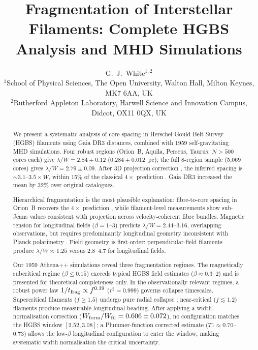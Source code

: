 \documentclass[twoside,twocolumn]{mnras}
\title{Fragmentation of Interstellar Filaments: Complete HGBS Analysis and MHD Simulations}
\author[G.~J.~White]{G.~J.~White$^{1,2}$\\
$^{1}$School of Physical Sciences, The Open University, Walton Hall, Milton Keynes, MK7 6AA, UK\\
$^{2}$Rutherford Appleton Laboratory, Harwell Science and Innovation Campus, Didcot, OX11 0QX, UK}
\begin{document}
\maketitle

\begin{abstract}
We present a systematic analysis of core spacing in Herschel Gould Belt Survey (HGBS)
filaments using Gaia DR3 distances, combined with 1959 self-gravitating MHD simulations.
Four robust regions (Orion~B, Aquila, Perseus, Taurus; $N>500$ cores each) give
$\lambda/W = 2.84 \pm 0.12$ ($0.284 \pm 0.012$~pc); the full 8-region sample (5,069 cores)
gives $\lambda/W = 2.79 \pm 0.09$. After 3D projection correction \citep{Andre2010,Planck2016},
the inferred spacing is ${\sim}3.1$--$3.5\times W$, within 15\% of the classical $4\times$
prediction \citep{Inutsuka1992}. Gaia DR3 increased the mean by 32\% over original catalogues.

Hierarchical fragmentation is the most plausible explanation: fibre-to-core spacing in
Orion~B recovers the $4\times$ prediction \citep{Yang2024}, while filament-level measurements
show sub-Jeans values consistent with projection across velocity-coherent fibre bundles.
Magnetic tension for longitudinal fields ($\beta = 1$--$3$) predicts $\lambda/W = 2.44$--$3.16$,
overlapping observations, but requires predominantly longitudinal geometry inconsistent with
Planck polarimetry \citep{Planck2016}. Field geometry is first-order: perpendicular-field
filaments produce $\lambda/W \approx 1.25$ versus $2.8$--$4.7$ for longitudinal fields.

Our 1959 Athena++ simulations reveal three fragmentation regimes. The magnetically subcritical
regime ($\beta \leq 0.15$) exceeds typical HGBS field estimates ($\beta \approx 0.3$--$2$)
and is presented for theoretical completeness only. In the observationally relevant regimes,
a robust power law $1/t_{\rm frag} \propto f^{0.39}$ ($r^2 = 0.999$) governs collapse
timescales. Supercritical filaments ($f \geq 1.5$) undergo pure radial collapse
\citep{Nagasawa1987}; near-critical ($f \lesssim 1.2$) filaments produce measurable
longitudinal beading. After applying a width-normalisation correction
($W_{\rm form}/W_{\rm fil} = 0.606 \pm 0.072$), no configuration matches the HGBS window
$[2.52, 3.08]$; a Plummer-function corrected estimate ($T1 \approx 0.70$--$0.73$) allows
the low-$\beta$ longitudinal configuration to enter the window, making systematic width
normalisation the critical uncertainty.
\end{abstract}
\end{document}
